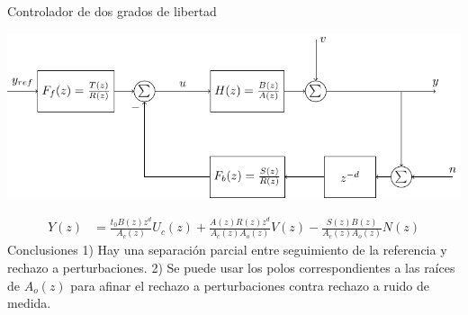\documentclass[presentation,aspectratio=169]{beamer}
\begin{document}
\begin{frame}[label={sec:orga9c783c}]{Controlador de dos grados de libertad}
\begin{center}
\includegraphics[width=0.7\linewidth]{../../figures/2dof-block-explicit}
\end{center}
\begin{align*}
Y(z) &= \frac{t_0B(z)z^d}{A_c(z)}U_c(z) + \frac{A(z)R(z)z^d}{A_c(z)A_o(z)}V(z)- \frac{S(z)B(z)}{A_c(z)A_o(z)}N(z)
\end{align*}
\alert{Conclusiones} 1) Hay una separación parcial entre seguimiento de la referencia y rechazo a perturbaciones. 2) Se puede usar los polos correspondientes a las raíces de \(A_o(z)\) para afinar el rechazo a perturbaciones contra rechazo a ruido de medida. 
\end{frame}
\end{document}
